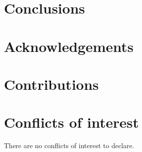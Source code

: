 \documentclass[
    9pt,            %
    twocolumn,      %
    commun,         %
    lineno,         %
    tocfig,         %
]{pi-article}
\begin{document}
\lipsum[2-4] %

\section{Conclusions}
\lipsum[6-6] %

\section*{Acknowledgements}
\lipsum[7-7] %

\section*{Contributions}
\lipsum[8-8] %

\section*{Conflicts of interest}
There are no conflicts of interest to declare.




\end{document}
